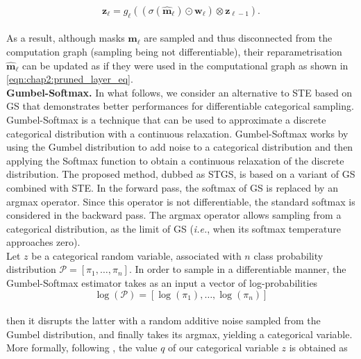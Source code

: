 \begin{equation}
  \label{eqn:chap2:pruned_layer_eq2}
  \mathbf{z}_{\ell} = g_\ell( ( \sigma(\bm{\hat{m}}_\ell) \odot \bm{w}_\ell ) \otimes \mathbf{z}_{\ell-1} ).
\end{equation} \\

\noindent As a result, although masks $\bm{m}_\ell$ are sampled and thus
disconnected from the computation graph (sampling being not differentiable),
their reparametrisation $\bm{\hat{m}}_\ell$ can be updated as if they were used
in the computational graph as shown in \cref{eqn:chap2:pruned_layer_eq}.\\


\noindent\textbf{Gumbel-Softmax.} In what follows, we consider an alternative to
\ac{STE} based on \acf{GS} \cite{DBLP:conf/iclr/JangGP17} that
demonstrates better performances for differentiable categorical sampling.
Gumbel-Softmax is a technique that can be used to approximate a discrete
categorical distribution with a continuous relaxation. Gumbel-Softmax works by
using the Gumbel distribution to add noise to a categorical distribution and
then applying the Softmax function to obtain a continuous relaxation of the
discrete distribution. The proposed method, dubbed as \acf{STGS}, is based on a
variant of \acl{GS} combined with \acl{STE}. In the forward pass, the softmax of
\ac{GS} is replaced by an argmax operator. Since this operator is not
differentiable, the standard softmax is considered in the backward pass. The
argmax operator allows sampling from a categorical distribution, as the limit of
\ac{GS} (\emph{i.e.}, when its softmax temperature approaches zero). \\

Let $z$ be a categorical random variable, associated with $n$ class probability
distribution $\mathcal{P} = [\pi_1,\dots,\pi_n]$. In order to sample in a
differentiable manner, the Gumbel-Softmax estimator takes as an input a vector
of log-probabilities \\

\begin{equation}
  \label{eqn:chap2:gumbel-softmax-input}
  \log(\mathcal{P}) =[\log(\pi_1),\dots, \log(\pi_n)]
\end{equation}\\

then it disrupts the latter with a random additive noise sampled from the Gumbel
distribution, and finally takes its argmax, yielding a categorical
variable. More formally, following \cite{DBLP:conf/iclr/JangGP17}, the value $q$
of our categorical variable $z$ is obtained as \\


